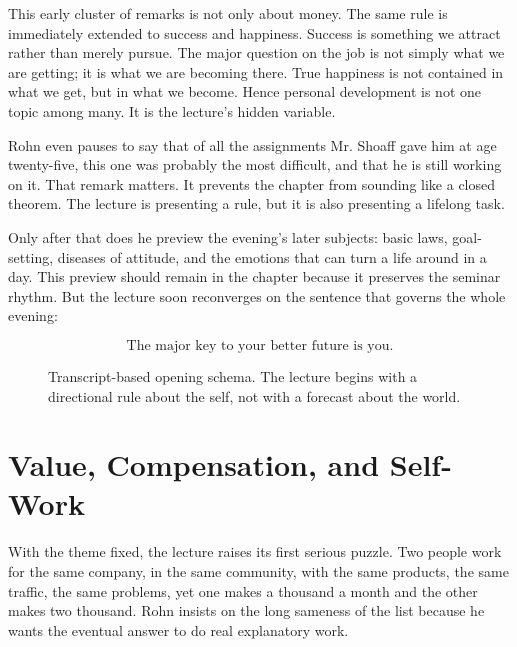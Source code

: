 This early cluster of remarks is not only about money. The same rule is immediately extended to success and happiness. Success is something we attract rather than merely pursue. The major question on the job is not simply what we are getting; it is what we are becoming there. True happiness is not contained in what we get, but in what we become. Hence personal development is not one topic among many. It is the lecture's hidden variable.

Rohn even pauses to say that of all the assignments Mr. Shoaff gave him at age twenty-five, this one was probably the most difficult, and that he is still working on it. That remark matters. It prevents the chapter from sounding like a closed theorem. The lecture is presenting a rule, but it is also presenting a lifelong task.

Only after that does he preview the evening's later subjects: basic laws, goal-setting, diseases of attitude, and the emotions that can turn a life around in a day. This preview should remain in the chapter because it preserves the seminar rhythm. But the lecture soon reconverges on the sentence that governs the whole evening:

\begin{equation}
\text{The major key to your better future is you.}
\end{equation}

\begin{figure}[t]
\centering
{}
\caption{Transcript-based opening schema. The lecture begins with a directional rule about the self, not with a forecast about the world.}
\end{figure}

\section{Value, Compensation, and Self-Work}

With the theme fixed, the lecture raises its first serious puzzle. Two people work for the same company, in the same community, with the same products, the same traffic, the same problems, yet one makes a thousand a month and the other makes two thousand. Rohn insists on the long sameness of the list because he wants the eventual answer to do real explanatory work.

